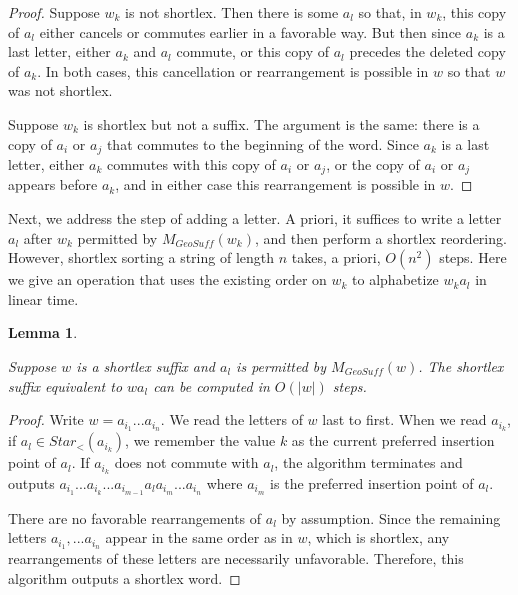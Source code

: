 \documentclass{amsart}
\newtheorem{lemma}[theorem]{Lemma}
\theoremstyle{definition}
\theoremstyle{remark}
\begin{document}
	\begin{proof}
		
		Suppose $w_k$ is not shortlex. Then there is some $a_l$ so that, in $w_k$, this copy of $a_l$ either cancels or commutes earlier in a favorable way. But then since $a_k$ is a last letter, either $a_k$ and $a_l$ commute, or this copy of $a_l$ precedes the deleted copy of $a_k$. In both cases, this cancellation or rearrangement is possible in $w$ so that $w$ was not shortlex.
		
		Suppose $w_k$ is shortlex but not a suffix. The argument is the same: there is a copy of $a_i$ or $a_j$ that commutes to the beginning of the word. Since $a_k$ is a last letter, either $a_k$ commutes with this copy of $a_i$ or $a_j$, or the copy of $a_i$ or $a_j$ appears before $a_k$, and in either case this rearrangement is possible in $w$.
	\end{proof}
	
	Next, we address the step of adding a letter. A priori, it suffices to write a letter $a_l$ after $w_k$ permitted by $M_{GeoSuff}(w_k)$, and then perform a shortlex reordering. However, shortlex sorting a string of length $n$ takes, a priori, $O(n^2)$ steps. Here we give an operation that uses the existing order on $w_k$ to alphabetize $w_ka_l$ in linear time.
	
	\begin{lemma}\label{ShortlexInsertion}
		
		Suppose $w$ is a shortlex suffix and $a_l$ is permitted by $M_{GeoSuff}(w)$. The shortlex suffix equivalent to $wa_l$ can be computed in $O(|w|)$ steps.
		
	\end{lemma}
	
	\begin{proof}
		
		Write $w=a_{i_1}...a_{i_n}$. We read the letters of $w$ last to first. When we read $a_{i_k}$, if \newline $a_l\in Star_<(a_{i_k})$, we remember the value $k$ as the current preferred insertion point of $a_l$. If $a_{i_k}$ does not commute with $a_l$, the algorithm terminates and outputs $a_{i_1}...a_{i_k}...a_{i_{m-1}}a_la_{i_m}...a_{i_n}$ where $a_{i_m}$ is the preferred insertion point of $a_l$.
		
		There are no favorable rearrangements of $a_l$ by assumption. Since the remaining letters $a_{i_1},...a_{i_n}$ appear in the same order as in $w$, which is shortlex, any rearrangements of these letters are necessarily unfavorable. Therefore, this algorithm outputs a shortlex word.
	\end{proof}
	
\end{document}
